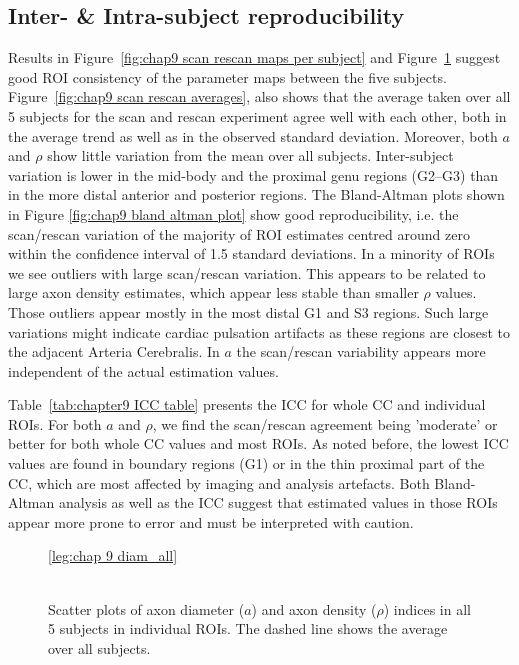 \subsection{Inter- \& Intra-subject reproducibility}
Results in Figure~\ref{fig:chap9 scan rescan maps per subject} and  Figure~\ref{fig:chap9 scan rescan scatterplots per subject} suggest good \gls{ROI} consistency of the parameter maps between the five subjects. Figure~\ref{fig:chap9 scan rescan averages}, also shows that the average taken over all 5 subjects for the scan and rescan experiment agree well with each other, both in the average trend as well as in the observed standard deviation. Moreover, both $a$ and $\rho$ show little variation from the mean over all subjects. Inter-subject variation is lower in the mid-body and the proximal genu regions (G2--G3) than in the more distal anterior and posterior regions. The Bland-Altman plots shown in Figure \ref{fig:chap9 bland altman plot} show good reproducibility, i.e. the scan/rescan variation of the majority of \gls{ROI} estimates centred around zero within the confidence interval of 1.5 standard deviations. In a minority of \glspl{ROI} we see outliers with large scan/rescan variation. This appears to be related to large axon density estimates, which appear less stable than smaller $\rho$ values. Those outliers appear mostly in the most distal G1 and S3 regions. Such large variations might indicate cardiac pulsation artifacts as these regions are closest to the adjacent Arteria Cerebralis. In $a$ the scan/rescan variability appears more independent of the actual estimation values.


Table~\ref{tab:chapter9 ICC table} presents the \gls{ICC} for whole \gls{CC} and individual \gls{ROI}s. For both $a$ and $\rho$, we find the scan/rescan agreement being 'moderate' or better for both whole \gls{CC} values and most \gls{ROI}s. As noted before, the lowest ICC values are found in boundary regions (G1) or in the thin proximal part of the \gls{CC}, which are most affected by imaging and analysis artefacts. Both Bland-Altman analysis as well as the ICC suggest that estimated values in those \gls{ROI}s appear more prone to error and must be interpreted with caution.

\begin{figure}[ht]
	\centering
	\ref{leg:chap 9 diam_all}
	\\	
	\\
	\caption{Scatter plots of axon diameter ($a$) and axon density ($\rho$) indices in all 5 subjects in individual \gls{ROI}s. The dashed line shows the average over all subjects.}
	\label{fig:chap9 scan rescan scatterplots per subject}
\end{figure}

